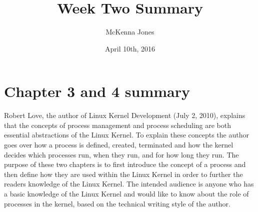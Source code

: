 \documentclass[letterpaper,10pt]{article}
\title{Week Two Summary}
\author{McKenna Jones}
\date{April 10th, 2016}
\begin{document}
\begin{titlepage}
\maketitle
\end{titlepage}

\section{Chapter 3 and 4 summary}
Robert Love, the author of Linux Kernel Development (July 2, 2010), explains that the concepts of process management and process scheduling are both essential abstractions of the Linux Kernel. To explain these concepts the author goes over how a process is defined, created, terminated and how the kernel decides which processes run, when they run, and for how long they run. The purpose of these two chapters is to first introduce the concept of a process and then define how they are used within the Linux Kernel in order to further the readers knowledge of the Linux Kernel. The intended audience is anyone who has a basic knowledge of the Linux Kernel and would like to know about the role of processes in the kernel, based on the technical writing style of the author. 
\end{document}

